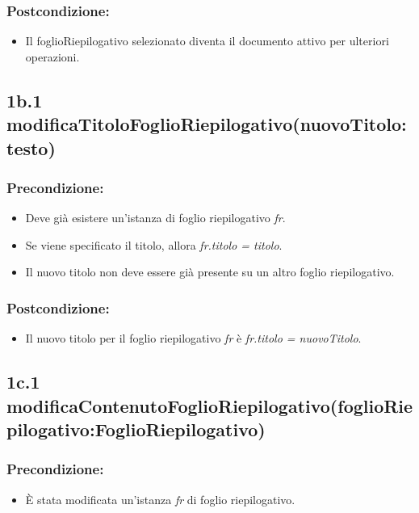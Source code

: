 \subsubsection*{Postcondizione:}
\begin{itemize}
    \item Il foglioRiepilogativo selezionato diventa il documento attivo per ulteriori operazioni.
\end{itemize}

\subsection*{1b.1 modificaTitoloFoglioRiepilogativo(nuovoTitolo:testo)}

\subsubsection*{Precondizione:}
\begin{itemize}
    \item Deve già esistere un'istanza di foglio riepilogativo \textit{fr}.
    \item Se viene specificato il titolo, allora \textit{fr.titolo = titolo}.
    \item Il nuovo titolo non deve essere già presente su un altro foglio riepilogativo.
\end{itemize}

\subsubsection*{Postcondizione:}
\begin{itemize}
    \item Il nuovo titolo per il foglio riepilogativo \textit{fr} è \textit{fr.titolo = nuovoTitolo}.
\end{itemize}

\subsection*{1c.1 modificaContenutoFoglioRiepilogativo(foglioRiepilogativo:FoglioRiepilogativo)}

\subsubsection*{Precondizione:}
\begin{itemize}
    \item È stata modificata un'istanza \textit{fr} di foglio riepilogativo.
\end{itemize}


